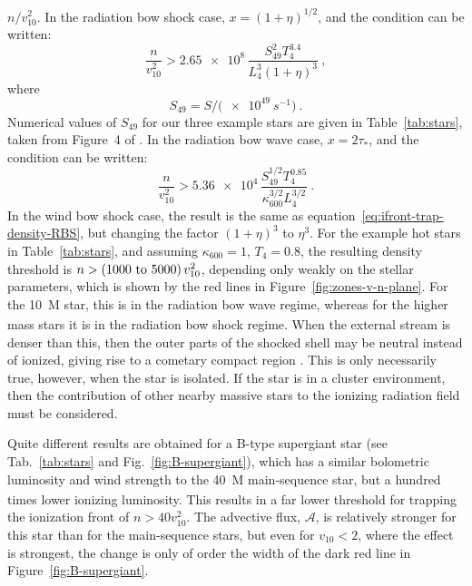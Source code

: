 \(n / v_{10}^2\).  In the radiation bow shock case,
\(x = (1 + \eta)^{1/2}\), and the condition can be written:
\begin{equation}
  \label{eq:ifront-trap-density-RBS}
  \frac{n}{v_{10}^2} > \num{2.65e8} \, \frac{S_{49}^2 T_4^{3.4}}{L_4^3 (1 + \eta)^3} \ , 
\end{equation}
where
\begin{equation*}
  S_{49} = S / \bigl( \SI{e49}{s^{-1}} \bigr) \ .
\end{equation*}
Numerical values of \(S_{49}\) for our three example stars are given
in Table~\ref{tab:stars}, taken from Figure~4 of
\citet{Sternberg:2003a}.  In the radiation bow wave case,
\(x = 2\tau_*\), and the condition can be written:
\begin{equation}
  \label{eq:ifront-trap-taustar-RBW}
  \frac{n}{v_{10}^2} > \num{5.36e4} \, \frac{S_{49}^{1/2} T_4^{0.85} }{\kappa_{600}^{3/2} L_4^{3/2}} \ . 
\end{equation}
In the wind bow shock case, the result is the same as
equation~\eqref{eq:ifront-trap-density-RBS}, but changing the factor
\((1 + \eta)^3\) to \(\eta^3\).  For the example hot stars in
Table~\ref{tab:stars}, and assuming \(\kappa_{600} = 1\),
\(T_4 = 0.8\), the resulting density threshold is
\(n > (\text{\numrange{1000}{5000}})\, v_{10}^2\), depending only
weakly on the stellar parameters, which is shown by the red lines in
Figure~\ref{fig:zones-v-n-plane}.  For the \SI{10}{M_\odot} star, this is
in the radiation bow wave regime, whereas for the higher mass stars it
is in the radiation bow shock regime.  When the external stream is
denser than this, then the outer parts of the shocked shell may be
neutral instead of ionized, giving rise to a cometary compact \hii{}
region \citep{Mac-Low:1991a, Arthur:2006a}.  This is only necessarily
true, however, when the star is isolated.  If the star is in a cluster
environment, then the contribution of other nearby massive stars to
the ionizing radiation field must be considered.

Quite different results are obtained for a B-type supergiant star (see
Tab.~\ref{tab:stars} and Fig.~\ref{fig:B-supergiant}), which has a
similar bolometric luminosity and wind strength to the \SI{40}{M_\odot}
main-sequence star, but a hundred times lower ionizing luminosity.
This results in a far lower threshold for trapping the ionization
front of \(n > 40 v_{10}^2\).  The advective flux, \(\mathcal{A}\), is
relatively stronger for this star than for the main-sequence stars, but
even for \(v_{10} < 2\), where the effect is strongest, the change is
only of order the width of the dark red line in
Figure~\ref{fig:B-supergiant}.


